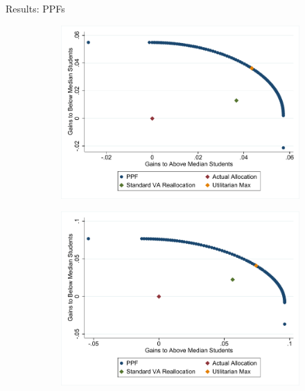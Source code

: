 \documentclass[t,aspectratio=169]{beamer}
\begin{document}
\begin{frame}{Results: PPFs}
\begin{figure}[H]
    \centering
    
    \begin{subfigure}[b]{0.45\textwidth}
        \includegraphics[width=1\textwidth]{Working_Paper/WP_Figures/AcrossSchoolReallocationELA.pdf}
    \end{subfigure}
    \begin{subfigure}[b]{0.45\textwidth}
        \includegraphics[width=1\textwidth]{Working_Paper/WP_Figures/AcrossSchoolReallocationMath.pdf}
    \end{subfigure}
\end{figure}

\end{frame}
\end{document}
